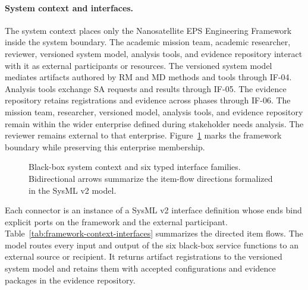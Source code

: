 \documentclass[11pt,a4paper]{article}
\begin{document}
\paragraph{System context and interfaces.}
The system context places only the Nanosatellite EPS Engineering Framework inside the system boundary. The academic mission team, academic researcher, reviewer, versioned system model, analysis tools, and evidence repository interact with it as external participants or resources. The versioned system model mediates artifacts authored by RM and MD methods and tools through IF-04. Analysis tools exchange SA requests and results through IF-05. The evidence repository retains registrations and evidence across phases through IF-06. The mission team, researcher, versioned model, analysis tools, and evidence repository remain within the wider enterprise defined during stakeholder needs analysis. The reviewer remains external to that enterprise. Figure~\ref{fig:framework-system-context} marks the framework boundary while preserving this enterprise membership.

\begin{figure}[H]
    \centering
    \resizebox{\linewidth}{!}{}
    \caption{Black-box system context and six typed interface families. Bidirectional arrows summarize the item-flow directions formalized in the SysML v2 model.}
    \label{fig:framework-system-context}
\end{figure}

Each connector is an instance of a SysML v2 interface definition whose ends bind explicit ports on the framework and the external participant. Table~\ref{tab:framework-context-interfaces} summarizes the directed item flows. The model routes every input and output of the six black-box service functions to an external source or recipient. It returns artifact registrations to the versioned system model and retains them with accepted configurations and evidence packages in the evidence repository.
\end{document}
